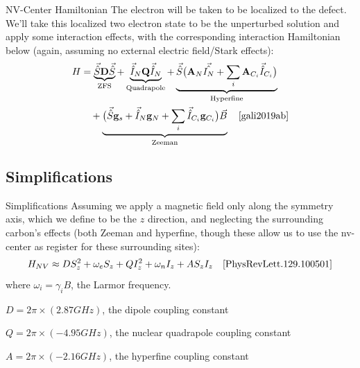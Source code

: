 \documentclass[11pt]{beamer}
\begin{document}
\begin{frame}{NV-Center Hamiltonian}
The electron will be taken to be localized to the defect. We'll take this localized two electron state to be the unperturbed solution and apply some interaction effects, with the corresponding interaction Hamiltonian below (again, assuming no external electric field/Stark effects):
\begin{align*}
H&=\underbrace{\vec{\hat{S}}\mathbf{D}\vec{\hat{S}}}_{\text{ZFS}} +   \underbrace{\vec{\hat{I}}_N\mathbf{Q} \vec{\hat{I}}_N}_{\text{Quadrapole}}+\underbrace{\vec{\hat{S}}\big(\mathbf{A}_N\vec{\hat{I_N}}+\sum_i\mathbf{A}_{C_i}\vec{\hat{I}}_{C_i}\big)}_{\text{Hyperfine}}\\
&\quad +\underbrace{\big(\vec{\hat{S}}\mathbf{g}_s+\vec{\hat{I}}_N\mathbf{g}_N+\sum_i\vec{\hat{I}}_{C_i}\mathbf{g}_{C_i}\big)\vec{B}}_{\text{Zeeman}}\quad\cite{gali2019ab}\\
\end{align*}
\end{frame}
\subsection{Simplifications}
\begin{frame}{Simplifications}
Assuming we apply a magnetic field only along the symmetry axis, which we define to be the $z$ direction, and neglecting the surrounding carbon's effects (both Zeeman and hyperfine, though these allow us to use the nv-center as register for these surrounding sites):
$$
H_{NV}\approx DS_z^2 + \omega_eS_z + QI_z^2 +\omega_nI_z + AS_zI_z\quad\cite{PhysRevLett.129.100501}
$$
where $\omega_i = \gamma_i B$, the Larmor frequency. 

$D=2\pi\times (2.87 GHz)$, the dipole coupling constant

$Q=2\pi\times (-4.95 GHz)$, the nuclear quadrapole coupling constant

$A=2\pi\times (-2.16 GHz)$, the hyperfine coupling constant

\end{frame}
\end{document}
